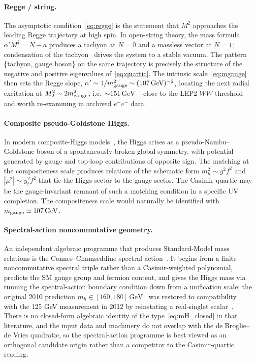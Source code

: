 \documentclass[twocolumn,aps,prd,floatfix,nofootinbib,superscriptaddress,10pt]{article}
\newcommand{\GeV}{\,\mathrm{GeV}}
\begin{document}
\paragraph*{Regge / string.} The asymptotic condition~\eqref{eq:regge} is the statement that $M^2$ approaches the leading Regge trajectory at high spin. In open-string theory, the mass formula $\alpha'M^2=N-a$ produces a tachyon at $N=0$ and a massless vector at $N=1$; condensation of the tachyon~\cite{Sen} drives the system to a stable vacuum. The pattern \{tachyon, gauge boson\} on the same trajectory is precisely the structure of the negative and positive eigenvalues of~\eqref{eq:quartic}. The intrinsic scale~\eqref{eq:mgauge} then sets the Regge slope, $\alpha'\sim 1/m_{\rm gauge}^2\sim (107\GeV)^{-2}$, locating the next radial excitation at $M_2^2\sim 2m_{\rm gauge}^2$, i.e.\ $\sim 151\GeV$ -- close to the LEP2 $WW$ threshold and worth re-examining in archived $e^+e^-$ data.

\paragraph*{Composite pseudo-Goldstone Higgs.} In modern composite-Higgs models~\cite{Contino}, the Higgs arises as a pseudo-Nambu--Goldstone boson of a spontaneously broken global symmetry, with potential generated by gauge and top-loop contributions of opposite sign. The matching at the compositeness scale produces relations of the schematic form $m_h^2\sim g^2 f^2$ and $|\mu^2|\sim y_t^2 f^2$ that tie the Higgs sector to the gauge sector. The Casimir quartic may be the gauge-invariant remnant of such a matching condition in a specific UV completion. The compositeness scale would naturally be identified with $m_{\rm gauge}\simeq 107\GeV$.

\paragraph*{Spectral-action noncommutative geometry.} An independent algebraic programme that produces Standard-Model mass relations is the Connes--Chamseddine spectral action~\cite{Connes1996,ChamseddineConnes2010,ChamseddineConnes2012}.  It begins from a finite noncommutative spectral triple rather than a Casimir-weighted polynomial, predicts the SM gauge group and fermion content, and gives the Higgs mass via running the spectral-action boundary condition down from a unification scale; the original 2010 prediction $m_h\in[160,180]\GeV$~\cite{ChamseddineConnes2010} was restored to compatibility with the 125 GeV measurement in 2012 by reinstating a real-singlet scalar~\cite{ChamseddineConnes2012}.  There is no closed-form algebraic identity of the type~\eqref{eq:mH_closed} in that literature, and the input data and machinery do not overlap with the de Broglie--de Vries quadratic, so the spectral-action programme is best viewed as an orthogonal candidate origin rather than a competitor to the Casimir-quartic reading.
\end{document}
